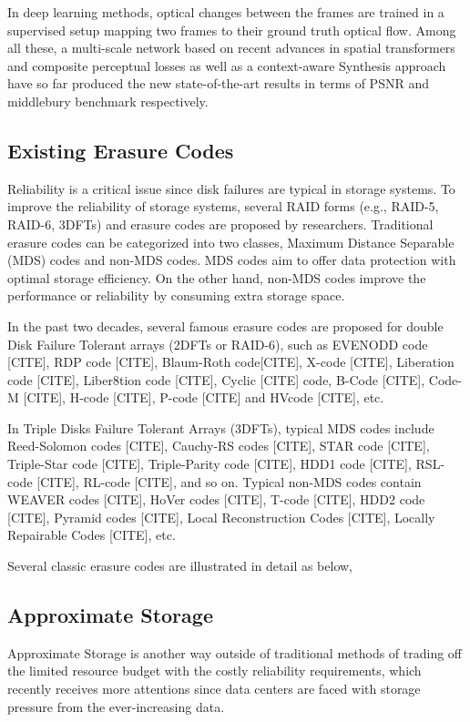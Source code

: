 \documentclass[sigconf]{acmart}
\begin{document}
In deep learning methods, optical changes between the frames are trained in a supervised setup mapping two frames to their ground truth optical flow. Among all these, a multi-scale network\cite{van2017frame} based on recent advances in spatial transformers and composite perceptual losses as well as a context-aware Synthesis approach\cite{niklaus2018context} have so far produced the new state-of-the-art results in terms of PSNR and middlebury benchmark respectively.


\subsection{Existing Erasure Codes}
Reliability is a critical issue since disk failures are typical in storage systems. To improve the reliability of storage systems, several RAID forms (e.g., RAID-5, RAID-6, 3DFTs) and erasure codes are proposed by researchers.  Traditional erasure codes can be categorized into two classes, Maximum Distance Separable (MDS) codes and non-MDS codes. MDS codes aim to offer data protection with optimal storage efficiency. On the other hand, non-MDS codes improve the performance or reliability by consuming extra storage space.

In the past two decades, several
famous erasure codes are proposed for double Disk Failure Tolerant arrays (2DFTs or RAID-6), such as EVENODD code [CITE], RDP code [CITE], Blaum-Roth code[CITE], X-code [CITE], Liberation code [CITE], Liber8tion code [CITE], Cyclic [CITE] code, B-Code [CITE], Code-M [CITE], H-code [CITE], P-code [CITE] and HVcode [CITE], etc.

In Triple Disks Failure Tolerant Arrays (3DFTs), typical MDS codes include Reed-Solomon codes [CITE], Cauchy-RS codes [CITE], STAR code [CITE], Triple-Star code [CITE], Triple-Parity code [CITE], HDD1 code [CITE], RSL-code [CITE], RL-code [CITE], and so on. Typical non-MDS codes contain WEAVER codes [CITE], HoVer
codes [CITE], T-code [CITE], HDD2 code [CITE], Pyramid codes [CITE], Local Reconstruction Codes [CITE], Locally Repairable Codes [CITE], etc.

Several classic erasure codes are illustrated in detail as below,


\subsection{Approximate Storage}
Approximate Storage is another way outside of traditional methods of trading off the limited resource budget with the costly reliability requirements, which recently receives more attentions since data centers are faced with storage pressure from the ever-increasing data.
\end{document}
